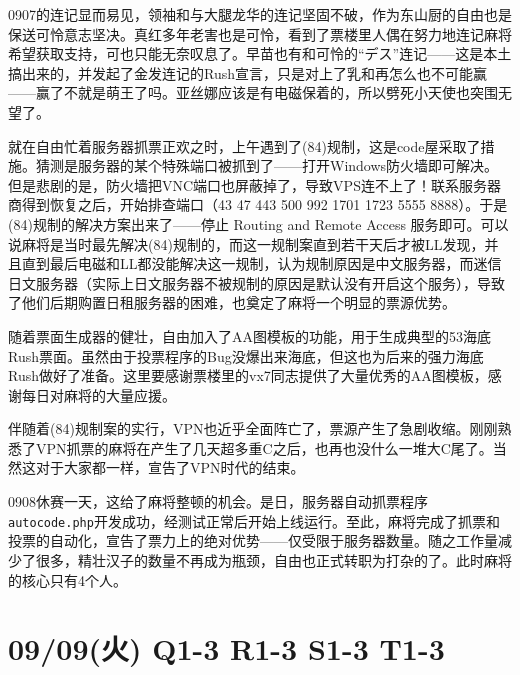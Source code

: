 0907的连记显而易见，领袖和与大腿龙华的连记坚固不破，作为东山厨的自由也是保送可怜意志坚决。真红多年老害也是可怜，看到了票楼里人偶在努力地连记麻将希望获取支持，可也只能无奈叹息了。早苗也有和可怜的“デス”连记——这是本土搞出来的，并发起了金发连记的Rush宣言，只是对上了乳和再怎么也不可能赢——赢了不就是萌王了吗。亚丝娜应该是有电磁保着的，所以劈死小天使也突围无望了。

就在自由忙着服务器抓票正欢之时，上午遇到了(84)规制，这是code屋采取了措施。猜测是服务器的某个特殊端口被抓到了——打开Windows防火墙即可解决。但是悲剧的是，防火墙把VNC端口也屏蔽掉了，导致VPS连不上了！联系服务器商得到恢复之后，开始排查端口（43 47 443 500 992 1701 1723 5555 8888）。于是(84)规制的解决方案出来了——停止 Routing and Remote Access 服务即可。可以说麻将是当时最先解决(84)规制的，而这一规制案直到若干天后才被LL发现，并且直到最后电磁和LL都没能解决这一规制，认为规制原因是中文服务器，而迷信日文服务器（实际上日文服务器不被规制的原因是默认没有开启这个服务），导致了他们后期购置日租服务器的困难，也奠定了麻将一个明显的票源优势。

随着票面生成器的健壮，自由加入了AA图模板的功能，用于生成典型的53海底Rush票面。虽然由于投票程序的Bug没爆出来海底，但这也为后来的强力海底Rush做好了准备。这里要感谢票楼里的vx7同志提供了大量优秀的AA图模板，感谢每日对麻将的大量应援。

伴随着(84)规制案的实行，VPN也近乎全面阵亡了，票源产生了急剧收缩。刚刚熟悉了VPN抓票的麻将在产生了几天超多重C之后，也再也没什么一堆大C尾了。当然这对于大家都一样，宣告了VPN时代的结束。

0908休赛一天，这给了麻将整顿的机会。是日，服务器自动抓票程序\verb=autocode.php=开发成功，经测试正常后开始上线运行。至此，麻将完成了抓票和投票的自动化，宣告了票力上的绝对优势——仅受限于服务器数量。随之工作量减少了很多，精壮汉子的数量不再成为瓶颈，自由也正式转职为打杂的了。此时麻将的核心只有4个人。

\section{09/09(火) Q1-3 R1-3 S1-3 T1-3}

